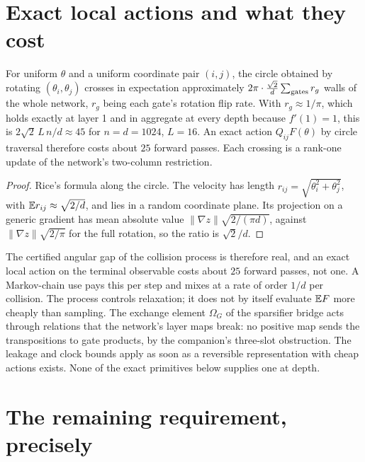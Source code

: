 \section{Exact local actions and what they cost}

\begin{proposition}
For uniform $\theta$ and a uniform coordinate pair $(i,j)$, the circle obtained by rotating $(\theta_i,\theta_j)$ crosses
in expectation approximately $2\pi\cdot\frac{\sqrt2}d\sum_{\rm gates}r_g$ walls of the whole network, $r_g$ being each gate's rotation
flip rate. With $r_g\approx1/\pi$, which holds exactly at layer 1 and in aggregate at every depth because $f'(1)=1$, this
is $2\sqrt2\,L\,n/d\approx45$ for $n=d=1024$, $L=16$. An exact action $Q_{ij}F(\theta)$ by circle traversal therefore costs
about $25$ forward passes. Each crossing is a rank-one update of the network's two-column restriction.
\end{proposition}
\begin{proof}
Rice's formula along the circle. The velocity has length $r_{ij}=\sqrt{\theta_i^2+\theta_j^2}$, with $\mathbb{E} r_{ij}\approx
\sqrt{2/d}$, and lies in a random coordinate plane. Its projection on a generic gradient has mean absolute value
$\|\nabla z\|\sqrt{2/(\pi d)}$, against $\|\nabla z\|\sqrt{2/\pi}$ for the full rotation, so the ratio is $\sqrt2/d$.
\end{proof}

The certified angular gap of the collision process is therefore real, and an exact local action on the terminal
observable costs about $25$ forward passes, not one. A Markov-chain use pays this per step and mixes at a rate of order
$1/d$ per collision. The process controls relaxation; it does not by itself evaluate $\mathbb{E} F$ more cheaply than sampling. The
exchange element $\Omega_G$ of the sparsifier bridge acts through relations that the network's layer maps break: no
positive map sends the transpositions to gate products, by the companion's three-slot obstruction. The leakage and clock
bounds apply as soon as a reversible representation with cheap actions exists. None of the exact primitives below
supplies one at depth.

\section{The remaining requirement, precisely}

